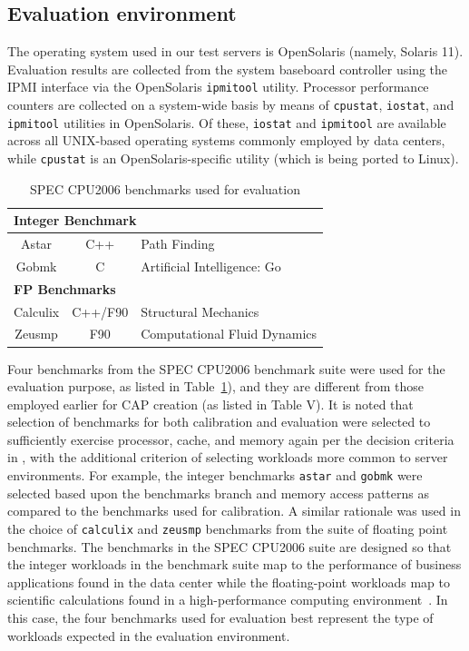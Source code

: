 \documentclass[acmtaco]{acmtrans2m}
\begin{document}
\subsection{Evaluation environment}
\label{sec:measurementtools}
The operating system used in our test servers is OpenSolaris (namely,
Solaris 11).  Evaluation results are collected from the system baseboard
controller using the IPMI interface via the OpenSolaris
\texttt{ipmitool} utility.  Processor performance counters are collected
on a system-wide basis by means of \texttt{cpustat}, \texttt{iostat},
and \texttt{ipmitool} utilities in OpenSolaris.  Of these,
\texttt{iostat} and \texttt{ipmitool} are available across all
UNIX-based operating systems commonly employed by data centers, while
\texttt{cpustat} is an OpenSolaris-specific utility (which is being
ported to Linux).
\begin{table}[tbp]
  \centering
  \caption{SPEC CPU2006 benchmarks used for evaluation}
  \label{tab:addspec}
  \begin{tabular}{c c p{5cm}}
    \hline
    \multicolumn{3}{l}{\textbf{Integer Benchmark}} \\
    \hline
    Astar&C++&Path Finding\\
    Gobmk&C&Artificial Intelligence: Go\\
    \multicolumn{3}{l}{\textbf{FP Benchmarks}} \\
    \hline
    Calculix&C++/F90&Structural Mechanics\\
    Zeusmp&F90&Computational Fluid Dynamics\\
    \hline
  \end{tabular}
\end{table}

Four benchmarks from the SPEC CPU2006 benchmark suite were used for the
evaluation purpose, as listed in Table~\ref{tab:addspec}), and they are
different from those employed earlier for CAP creation (as listed in
Table V). It is noted that selection of benchmarks for both calibration
and evaluation were selected to sufficiently exercise processor, cache,
and memory again per the decision criteria in \cite{Phansalkar2007},
with the additional criterion of selecting workloads more common to
server environments. For example, the integer benchmarks
\texttt{astar} and \texttt{gobmk} were selected based upon the
benchmarks branch and memory
access patterns as compared to the benchmarks used for
calibration.  A similar rationale was used in the choice of
\texttt{calculix} and \texttt{zeusmp} benchmarks
from the suite of floating point benchmarks.  The benchmarks in the SPEC
CPU2006 suite are designed so that the integer workloads in the
benchmark suite map to the performance of business applications found in
the data center while the floating-point workloads map to scientific
calculations found in a high-performance computing
environment~\cite{Cisco2010}.   In this case, the four benchmarks used
for evaluation best represent the type of workloads expected in the
evaluation environment.
\end{document}
